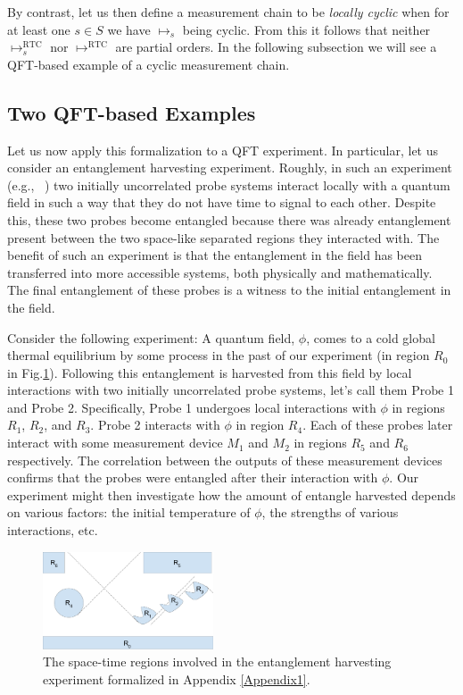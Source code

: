\documentclass[prd,twocolumn,superscriptaddress,floatfix,amsmath,amssymb,amsfonts,nofootinbib]{revtex4-2}
\begin{document}
By contrast, let us then define a measurement chain to be \textit{locally cyclic} when for at least one $s\in S$ we have $\mapsto_s$ being cyclic. From this it follows that neither $\mapsto^\text{RTC}_s$ nor $\mapsto^\text{RTC}$ are partial orders. In the following subsection we will see a QFT-based example of a cyclic measurement chain.

\subsection{Two QFT-based Examples}\label{Appendix1.3}
Let us now apply this formalization to a QFT experiment. In particular, let us consider an entanglement harvesting experiment. Roughly, in such an experiment (e.g., ~\cite{Valentini1991, Reznik2003, Pozas-Kerstjens:2015,Menicucci, Terno2016, Cosmo, Henderson2018,Ruep2021}) two initially uncorrelated probe systems interact locally with a quantum field in such a way that they do not have time to signal to each other. Despite this, these two probes become entangled because there was already entanglement present between the two space-like separated regions they interacted with. The benefit of such an experiment is that the entanglement in the field has been transferred into more accessible systems, both physically and mathematically. The final entanglement of these probes is a witness to the initial entanglement in the field.

Consider the following experiment: A quantum field, $\phi$, comes to a cold global thermal equilibrium by some process in the past of our experiment (in region $R_0$ in Fig.\ref{FigEntHarv}). Following this entanglement is harvested from this field by local interactions with two initially uncorrelated probe systems, let's call them $\text{Probe}$ 1 and $\text{Probe}$ 2. Specifically, $\text{Probe}$ 1 undergoes local interactions with $\phi$ in regions $R_1$, $R_2$, and $R_3$. $\text{Probe}$ 2 interacts with $\phi$ in region $R_4$. Each of these probes later interact with some measurement device $M_1$ and $M_2$ in regions $R_5$ and $R_6$ respectively. The correlation between the outputs of these measurement devices confirms that the probes were entangled after their interaction with $\phi$. Our experiment might then investigate how the amount of entangle harvested depends on various factors: the initial temperature of $\phi$, the strengths of various interactions, etc. 

\begin{figure}
\includegraphics[width=0.45\textwidth]{Figures/EntHarvDiagram.pdf}
\caption{The space-time regions involved in the entanglement harvesting experiment formalized in Appendix \ref{Appendix1}.}\label{FigEntHarv}
\end{figure}
\end{document}
